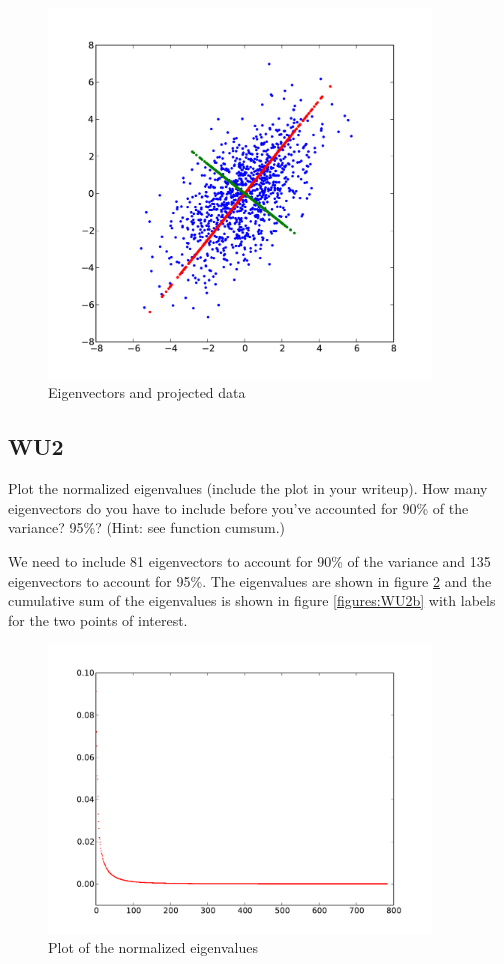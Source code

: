 \documentclass[a4paper,11pt]{article}
\begin{document}
\begin{figure}[!ht]
  \begin{center}
  \includegraphics[width=4in]{WU1.pdf}
  \caption{Eigenvectors and projected data}
  \label{figures:WU1}
  \end{center}
\end{figure}

\subsection{WU2}
\textsf{Plot the normalized eigenvalues (include the plot in your writeup). 
How many eigenvectors do you have to include before you've accounted 
for 90\% of the variance? 95\%? (Hint: see function cumsum.)}\vspace{0.1in}

We need to include 81 eigenvectors to account for 90\% of the variance and
135 eigenvectors to account for 95\%. The eigenvalues are shown in figure
\ref{figures:WU2a} and the cumulative sum of the eigenvalues is shown in
figure \ref{figures:WU2b} with labels for the two points of interest.

\begin{figure}[!ht]
  \begin{center}
  \includegraphics[width=4in]{WU2_a.pdf}
  \caption{Plot of the normalized eigenvalues}
  \label{figures:WU2a}
  \end{center}
\end{figure}
\end{document}
